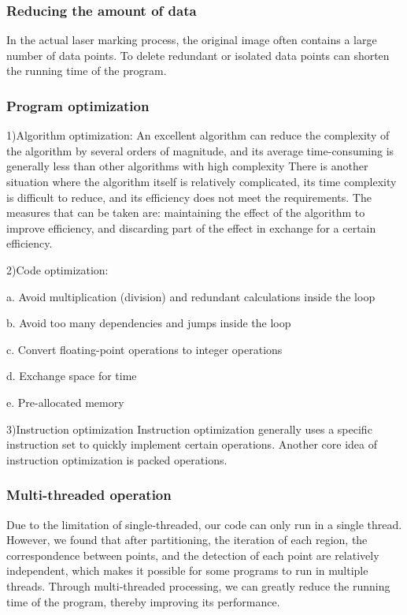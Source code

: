 \documentclass{apmcmthesis}
\begin{document}
\subsubsection{Reducing the amount of data}
In the actual laser marking process, the original image often contains a large number of data points. To delete redundant or isolated data points can shorten the running time of the program.
\subsubsection{Program optimization}
1)Algorithm optimization:
An excellent algorithm can reduce the complexity of the algorithm by several orders of magnitude, and its average time-consuming is generally less than other algorithms with high complexity
There is another situation where the algorithm itself is relatively complicated, its time complexity is difficult to reduce, and its efficiency does not meet the requirements. The measures that can be taken are: maintaining the effect of the algorithm to improve efficiency, and discarding part of the effect in exchange for a certain efficiency.


2)Code optimization:


a. Avoid multiplication (division) and redundant calculations inside the loop


b. Avoid too many dependencies and jumps inside the loop


c. Convert floating-point operations to integer operations


d. Exchange space for time


e. Pre-allocated memory


3)Instruction optimization
Instruction optimization generally uses a specific instruction set to quickly implement certain operations. Another core idea of instruction optimization is packed operations.

\subsubsection{Multi-threaded operation}
Due to the limitation of single-threaded, our code can only run in a single thread. However, we found that after partitioning, the iteration of each region, the correspondence between points, and the detection of each point are relatively independent, which makes it possible for some programs to run in multiple threads. Through multi-threaded processing, we can greatly reduce the running time of the program, thereby improving its performance.
\end{document}
